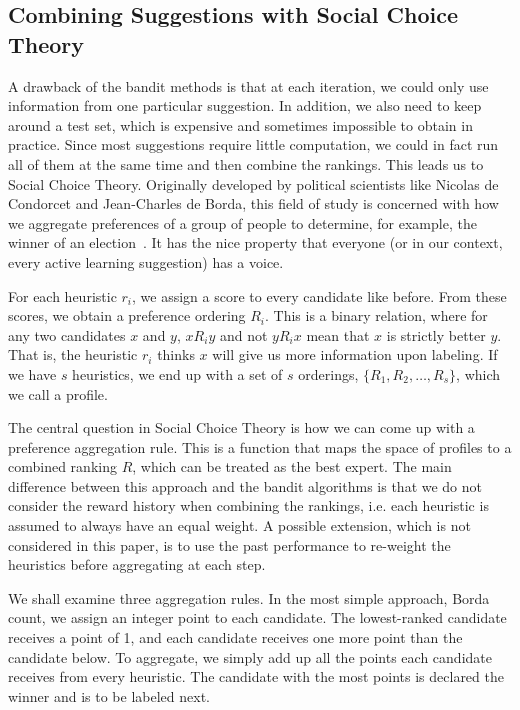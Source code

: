 \documentclass[fleqn,10pt,lineno]{wlpeerj} %
\begin{document}
\subsection*{Combining Suggestions with Social Choice Theory}

A drawback of the bandit methods is that at each iteration, we could only use
information from one particular suggestion. In addition, we also need to keep
around a test set, which is expensive and sometimes impossible to obtain in
practice. Since most suggestions require little computation, we could in fact
run all of them at the same time and then combine the rankings. This leads us
to Social Choice Theory. Originally developed by political scientists like
Nicolas de Condorcet and Jean-Charles de Borda, this field of study is
concerned with how we aggregate preferences of a group of people to determine,
for example, the winner of an election~\citep{list13}. It has the nice property
that everyone (or in our context, every active learning suggestion) has a
voice.

For each heuristic $r_i$, we assign a score to every candidate like before.
From these scores, we obtain a preference ordering $R_i$. This is a binary
relation, where for any two candidates $x$ and $y$, $xR_iy$ and not $yR_ix$
mean that $x$ is strictly better $y$. That is, the heuristic $r_i$ thinks $x$
will give us more information upon labeling. If we have $s$ heuristics, we end
up with a set of $s$ orderings, $\{ R_1, R_2, \ldots, R_s \}$, which we call a
profile.

The central question in Social Choice Theory is how we can come up with a
preference aggregation rule. This is a function that maps the space of profiles
to a combined ranking $R$, which can be treated as the best expert. The main
difference between this approach and the bandit algorithms is that we do not
consider the reward history when combining the rankings, i.e. each heuristic is
assumed to always have an equal weight. A possible extension, which is not
considered in this paper, is to use the past performance to re-weight the
heuristics before aggregating at each step.

We shall examine three aggregation rules. In the most simple approach, Borda
count, we assign an integer point to each candidate. The lowest-ranked
candidate receives a point of 1, and each candidate receives one more point
than the candidate below. To aggregate, we simply add up all the points each
candidate receives from every heuristic. The candidate with the most points
is declared the winner and is to be labeled next.
\end{document}
